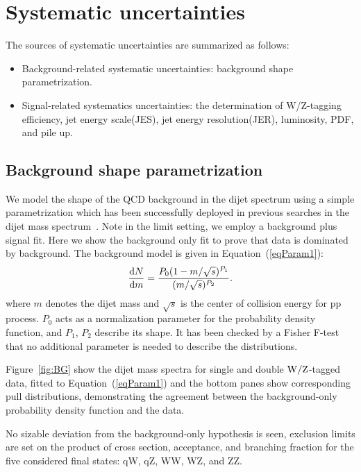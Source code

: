 \section{Systematic uncertainties}
\label{sec:systematics1}
The sources of systematic uncertainties are summarized as
follows:
\begin{itemize}
\item Background-related systematic uncertainties: background shape parametrization.
\item Signal-related systematics uncertainties: the determination of W/Z-tagging efficiency, jet energy scale(JES), jet energy resolution(JER), luminosity, PDF, and pile up.
\end{itemize}

\subsection{Background shape parametrization}
\label{sec:background1}

We model the shape of the QCD background in the dijet spectrum 
using a simple parametrization which has been successfully deployed in
previous searches in the dijet mass spectrum~\cite{cmsdijet}.
Note in the limit setting, we employ a background plus signal fit. Here
we show the background only fit to prove that data is dominated by background. 
The background model is given in Equation~(\ref{eqParam1}):
\begin{equation}
\frac{{\rm d}N}{{\rm d}m} = 
\frac{P_{0} (1 - m/\sqrt{s})^{P_{1}}}{(m/\sqrt{s})^{P_{2}
}} .
\label{eqParam1}
\end{equation}
\noindent where $m$ denotes the dijet mass and $\sqrt{s}$  is the center of collision energy for pp process.
$P_0$ acts as a normalization parameter for the probability
density function, and $P_1$, $P_2$ describe its shape.
It has been checked by a Fisher F-test that no additional parameter is needed to describe the distributions.

Figure~\ref{fig:BG} show the dijet mass spectra for
single and double ${\rm W}/{\rm Z}$-tagged data, fitted to Equation~(\ref{eqParam1}) and the bottom panes show corresponding pull
distributions, demonstrating the agreement between the background-only
probability density function and the data.

No sizable deviation from the background-only hypothesis is seen,
exclusion limits are set on the product of cross section, acceptance, and branching fraction for
the five considered final states: qW, qZ, WW, WZ, and ZZ.


